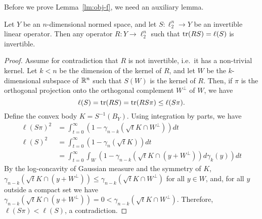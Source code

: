 Before we prove Lemma~\ref{lm:obj-f}, we need an auxiliary lemma.
\begin{lemma}\label{lm:invertible}
  Let $Y$ be an $n$-dimensional normed space, and let $S:\ell_2^n \to
  Y$ be an invertible linear operator. Then any operator $R:Y \to
  \ell_2^n$ such that $\operatorname{tr}(RS) = \ell(S)$ is invertible.
\end{lemma}
\begin{proof}
  Assume for contradiction that $R$ is not invertible, i.e.~it has a
  non-trivial kernel. Let $k<n$ be the dimension of the kernel of $R$,
  and let $W$ be the $k$-dimensional subspace of ${\mathbb{R}}^n$ such that $S(W)$
  is the kernel of $R$. Then, if $\pi$ is the orthogonal projection onto
  the orthogonal complement $W^\perp$ of $W$, we have
  \[
  \ell(S) = \operatorname{tr}(RS) = \operatorname{tr}(RS\pi) \le \ell(S\pi).
  \]
  Define the convex body $K = S^{-1}(B_Y)$. Using integration by
  parts, we have
  \begin{align*}
  \ell(S\pi)^2 &= \int_{t = 0}^\infty (1-\gamma_{n-k}(\sqrt{t}K\cap W^\perp))dt\\
  \ell(S)^2 &= \int_{t = 0}^\infty (1-\gamma_n(\sqrt{t}K))dt\\
  &= \int_{t = 0}^\infty \int_{W}(1-\gamma_{n-k}(\sqrt{t}K \cap (y + W^\perp))d\gamma_{k}(y))dt
  \end{align*}
  By the log-concavity of Gaussian measure and the symmetry of $K$,
  $\gamma_{n-k}(\sqrt{t}K \cap (y + W^\perp)) \le \gamma_{n-k}(\sqrt{t}K \cap
  W^\perp)$ for all $y \in W$, and, for all $y$ outside a
  compact set we have $\gamma_{n-k}(\sqrt{t}K \cap (y + W^\perp)) = 0 <
  \gamma_{n-k}(\sqrt{t}K \cap W^\perp)$. Therefore, $\ell(S\pi) < \ell(S)$, a
  contradiction.
\end{proof}


